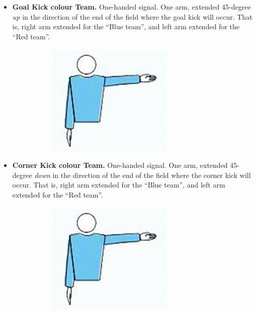 \begin{itemize}
            
            \item \textbf{Goal Kick \textlangle{}colour\textrangle{} Team.}
            One-handed signal. One arm, extended 45-degree \emph{up} in the direction of the end of the field where the goal kick will occur. That is, right arm extended for the ``Blue team'', and left arm extended for the ``Red team''.
            \begin{figure}[ht!]
                \centering
                \begin{subfigure}{.33\textwidth}
                  \includegraphics{figs/kick-off_referee.jpg}
                \end{subfigure}%
            \end{figure}


            \item \textbf{Corner Kick \textlangle{}colour\textrangle{} Team.}
            One-handed signal. One arm, extended 45-degree \emph{down} in the direction of the end of the field where the corner kick will occur. That is, right arm extended for the ``Blue team'', and left arm extended for the ``Red team''.
            \begin{figure}[ht!]
                \centering
                \begin{subfigure}{.33\textwidth}
                  \includegraphics{figs/kick-off_referee.jpg}
                \end{subfigure}%
            \end{figure}
            


\end{itemize}
